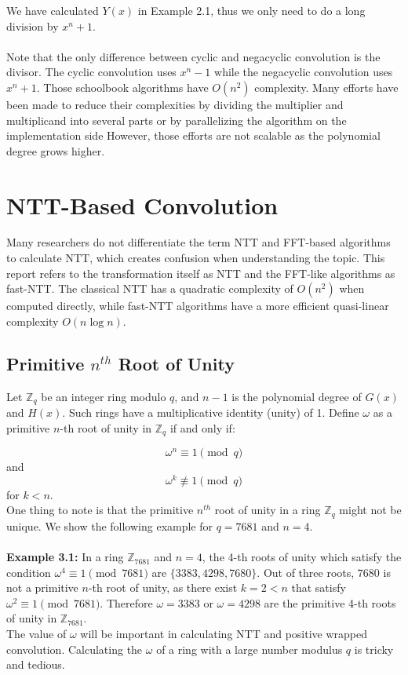 \documentclass[12pt]{report}
\begin{document}
\noindent We have calculated $Y(x)$ in Example 2.1, thus we only need to do a long division by $x^{n}+1$. \\ \\
Note that the only difference between cyclic and negacyclic convolution is the divisor. The cyclic convolution uses $x^n - 1$ while the negacyclic convolution uses $x^n + 1$. Those schoolbook algorithms have $O(n^2)$ complexity. Many efforts have been made to reduce their complexities by dividing the multiplier and multiplicand into several parts or by parallelizing the algorithm on the implementation side However, those efforts are not scalable as the polynomial degree grows higher.

\section{NTT-Based Convolution}
Many researchers do not differentiate the term NTT and FFT-based algorithms to calculate NTT, which creates confusion when understanding the topic. This report refers to the transformation itself as NTT and the FFT-like algorithms as fast-NTT. The classical NTT has a quadratic complexity of $O(n^2)$ when computed directly, while fast-NTT algorithms have a more efficient quasi-linear complexity $O(n \log n)$.

\subsection{Primitive $n^{th}$ Root of Unity}

Let $\mathbb{Z}_q$ be an integer ring modulo $q$, and $n-1$ is the polynomial degree of $G(x)$ and $H(x)$. Such rings have a multiplicative identity (unity) of 1. Define $\omega$ as a primitive $n$-th root of unity in $\mathbb{Z}_q$ if and only if:

\[\omega^n \equiv 1 \pmod{q}\]
and
\[\omega^k \not\equiv 1 \pmod{q}\]
for $k < n$.\\
One thing to note is that the primitive $n^{th}$ root of unity in a ring $\mathbb{Z}_q$ might not be unique. We show the following example for $q = 7681$ and $n = 4$. \\ \\
\textbf{Example 3.1:} In a ring $\mathbb{Z}_{7681}$ and $n = 4$, the 4-th roots of unity which satisfy the condition $\omega^4 \equiv 1 \pmod{7681}$ are $\{3383, 4298, 7680\}$. Out of three roots, $7680$ is not a primitive $n$-th root of unity, as there exist $k = 2 < n$ that satisfy $\omega^2 \equiv 1 \pmod{7681}$. Therefore $\omega = 3383$ or $\omega = 4298$ are the primitive 4-th roots of unity in $\mathbb{Z}_{7681}$.\\
\noindent The value of $\omega$ will be important in calculating NTT and positive wrapped convolution. Calculating the $\omega$ of a ring with a large number modulus $q$ is tricky and tedious.
\end{document}
